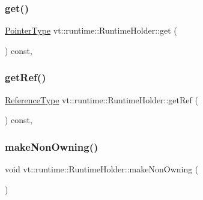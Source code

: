 \subsubsection{\texorpdfstring{get()}{get()}}
{\footnotesize\ttfamily \hyperlink{structvt_1_1runtime_1_1_runtime_holder_a9740e8aa7487fcf38b67a7e160d7b046}{Pointer\+Type} vt\+::runtime\+::\+Runtime\+Holder\+::get (\begin{DoxyParamCaption}{ }\end{DoxyParamCaption}) const\hspace{0.3cm}{\ttfamily [inline]}, {\ttfamily [private]}}

\mbox{\label{structvt_1_1runtime_1_1_runtime_holder_a998a38cda3304389bed85af42ac0a8c2}} 
\subsubsection{\texorpdfstring{get\+Ref()}{getRef()}}
{\footnotesize\ttfamily \hyperlink{structvt_1_1runtime_1_1_runtime_holder_a45aaa245b06497cfce58452b0d64b3fa}{Reference\+Type} vt\+::runtime\+::\+Runtime\+Holder\+::get\+Ref (\begin{DoxyParamCaption}{ }\end{DoxyParamCaption}) const\hspace{0.3cm}{\ttfamily [inline]}, {\ttfamily [private]}}

\mbox{\label{structvt_1_1runtime_1_1_runtime_holder_a3695fd20ff4f9058f34cb45e2b61232f}} 
\subsubsection{\texorpdfstring{make\+Non\+Owning()}{makeNonOwning()}}
{\footnotesize\ttfamily void vt\+::runtime\+::\+Runtime\+Holder\+::make\+Non\+Owning (\begin{DoxyParamCaption}{ }\end{DoxyParamCaption})\hspace{0.3cm}{\ttfamily [inline]}}

